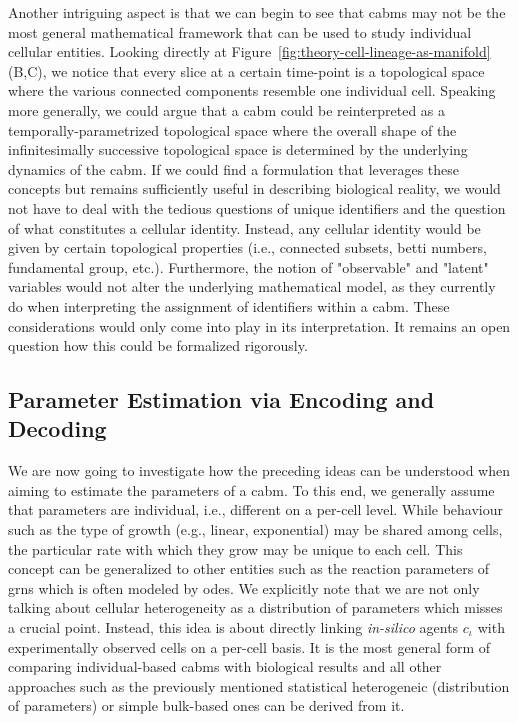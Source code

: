 Another intriguing aspect is that we can begin to see that \acp{cabm} may not be the most general
mathematical framework that can be used to study individual cellular entities.
Looking directly at Figure~\ref{fig:theory-cell-lineage-as-manifold} (B,C), we notice that every
slice at a certain time-point is a topological space where the various connected components
resemble one individual cell.
Speaking more generally, we could argue that a \ac{cabm} could be reinterpreted as a
temporally-parametrized topological space where the overall shape of the infinitesimally successive
topological space is determined by the underlying dynamics of the \ac{cabm}.
If we could find a formulation that leverages these concepts but remains sufficiently useful in
describing biological reality, we would not have to deal with the tedious questions of unique
identifiers and the question of what constitutes a cellular identity.
Instead, any cellular identity would be given by certain topological properties (i.e., connected
subsets, betti numbers, fundamental group, etc.).
Furthermore, the notion of "observable" and "latent" variables would not alter the underlying
mathematical model, as they currently do when interpreting the assignment of identifiers within a
\ac{cabm}.
These considerations would only come into play in its interpretation.
It remains an open question how this could be formalized rigorously.

\subsection{Parameter Estimation via Encoding and Decoding}
We are now going to investigate how the preceding ideas can be understood when aiming to estimate
the parameters of a \ac{cabm}.
To this end, we generally assume that parameters are individual, i.e., different on a per-cell level.
While behaviour such as the type of growth (e.g., linear, exponential) may be shared among cells, the
particular rate with which they grow may be unique to each cell.
This concept can be generalized to other entities such as the reaction parameters of \acp{grn} which
is often modeled by \acp{ode}.
We explicitly note that we are not only talking about cellular heterogeneity as a distribution of
parameters which misses a crucial point.
Instead, this idea is about directly linking \textit{in-silico} agents $c_\iota$ with experimentally
observed cells on a per-cell basis.
It is the most general form of comparing individual-based \acp{cabm} with biological results and all
other approaches such as the previously mentioned statistical heterogeneic (distribution of
parameters) or simple bulk-based ones can be derived from it.

